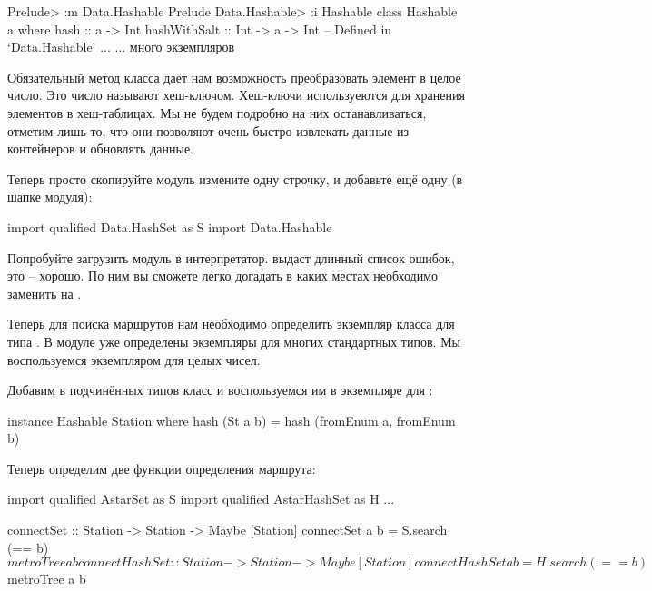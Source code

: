 \begin{code}
Prelude> :m Data.Hashable
Prelude Data.Hashable> :i Hashable
class Hashable a where
  hash :: a -> Int
  hashWithSalt :: Int -> a -> Int
  	-- Defined in `Data.Hashable'
...
... много экземпляров
\end{code}

Обязательный метод класса  даёт нам возможность
преобразовать элемент в целое число. Это число называют
хеш-ключом. Хеш-ключи используеются для хранения элементов в
хеш-таблицах. Мы не будем подробно на них останавливаться,
отметим лишь то, что они позволяют очень быстро извлекать
данные из контейнеров и  обновлять данные. 

Теперь просто скопируйте модуль  
измените одну строчку, и добавьте ещё одну (в шапке модуля):

\begin{code}
import qualified Data.HashSet as S
import Data.Hashable
\end{code}

Попробуйте загрузить модуль в интерпретатор. 
 выдаст длинный список ошибок, это -- хорошо.
По ним вы сможете легко догадать в каких местах необходимо
заменить  на .

Теперь для поиска маршрутов нам необходимо определить
экземпляр класса  для типа .
В модуле  уже определены экземпляры
для многих стандартных типов. Мы воспользуемся экземпляром
для целых чисел.

Добавим в  подчинённых типов
класс  и воспользуемся им в экземпляре
для : 

\begin{code}
instance Hashable Station where
    hash (St a b) = hash (fromEnum a, fromEnum b)
\end{code}

Теперь определим две функции определения маршрута:

\begin{code}
import qualified AstarSet       as S
import qualified AstarHashSet   as H
...

connectSet :: Station -> Station -> Maybe [Station]
connectSet a b = S.search (== b) $ metroTree a b

connectHashSet :: Station -> Station -> Maybe [Station]
connectHashSet a b = H.search (== b) $ metroTree a b
\end{code}

